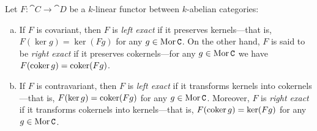 \begin{proposition}
\label{prop:abelian-cat-left-right-exact-functors}
Let \(F: \cat C \to \cat D\) be a \(k\)-linear functor between \(k\)-abelian
categories:
\begin{enumerate}[(a)]\setlength\itemsep{0em}
\item If \(F\) is covariant, then \(F\) is \emph{left exact} if it preserves
  kernels---that is, \(F(\ker g) = \ker(F g)\) for any \(g \in \operatorname{Mor} \texttt C\). On the
  other hand, \(F\) is said to be \emph{right exact} if it preserves
  cokernels---for any \(g \in \operatorname{Mor} \texttt C\) we have \(F(\operatorname{coker} g) = \operatorname{coker}(F g)\).

\item If \(F\) is contravariant, then \(F\) is \emph{left exact} if it
  transforms kernels into cokernels---that is, \(F(\ker g) = \operatorname{coker}(F g)\) for any
  \(g \in \operatorname{Mor} \texttt C\). Moreover, \(F\) is \emph{right exact} if it transforms
  cokernels into kernels---that is, \(F(\operatorname{coker} g) = \ker(F g)\) for any
  \(g \in \operatorname{Mor} \texttt C\).
\end{enumerate}
\end{proposition}


